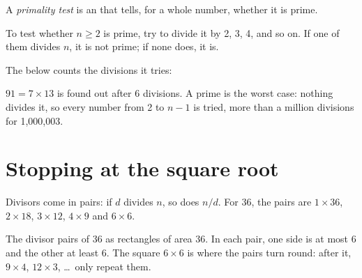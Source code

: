 \label{out:g9:algorithms-on-numbers:divisors}

\begin{definition}\label{def:g9:algorithms-on-numbers:primality-test}
A \emph{primality test} is an  that tells, for a
whole number, whether it is prime.
\end{definition}

\begin{method}\label{met:g9:algorithms-on-numbers:trial-division}
To test whether $n \ge 2$ is prime, try to divide it by 2,
3, 4, and so on. If one of them divides $n$, it is not prime; if none does, it
is.
\end{method}

The  below counts the divisions it tries:

\label{lst:g9:algorithms-on-numbers:slow}

\label{out:g9:algorithms-on-numbers:slow}

$91 = 7 \times 13$ is found out after 6 divisions. A prime is the worst case:
nothing divides it, so every number from 2 to $n - 1$ is tried, more than a
million divisions for 1,000,003.

\section{Stopping at the square root}

Divisors come in pairs: if $d$ divides $n$, so does $n / d$. For 36, the pairs
are $1 \times 36$, $2 \times 18$, $3 \times 12$, $4 \times 9$ and $6 \times 6$.

\begin{omfigure}

{\small The divisor pairs of 36 as rectangles of area 36. In each pair, one side
is at most 6 and the other at least 6. The square $6 \times 6$ is where the
pairs turn round: after it, $9 \times 4$, $12 \times 3$, \dots\ only repeat
them.}
\end{omfigure}

